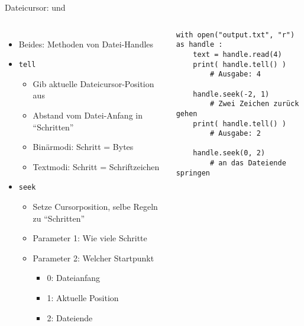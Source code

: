\begin{frame}[fragile]{Dateicursor:  und }
%
\begin{columns}[T]
\begin{itemize}
\item Beides: Methoden von Datei-Handles
\item	\texttt{tell}
	\begin{itemize}
	\item Gib aktuelle Dateicursor-Position aus
	\item Abstand vom Datei-Anfang in \enquote{Schritten}
	\item Binärmodi: Schritt = Bytes
	\item Textmodi: Schritt = Schriftzeichen
	\end{itemize}
\item \texttt{seek}
	\begin{itemize}
	\item Setze Cursorposition, selbe Regeln zu \enquote{Schritten}
	\item Parameter 1: Wie viele Schritte
	\item Parameter 2: Welcher Startpunkt
		\begin{itemize}
		\item 0: Dateianfang
		\item 1: Aktuelle Position
		\item 2: Dateiende
		\end{itemize}
	\end{itemize}
\end{itemize}
%
\begin{codebox}
\begin{verbatim}
with open("output.txt", "r") as handle :
    text = handle.read(4)
    print( handle.tell() )
        # Ausgabe: 4
    
    handle.seek(-2, 1)
        # Zwei Zeichen zurück gehen
    print( handle.tell() )
        # Ausgabe: 2
    
    handle.seek(0, 2)
        # an das Dateiende springen
\end{verbatim}
\end{codebox}
%
\end{columns}
%
\end{frame}


